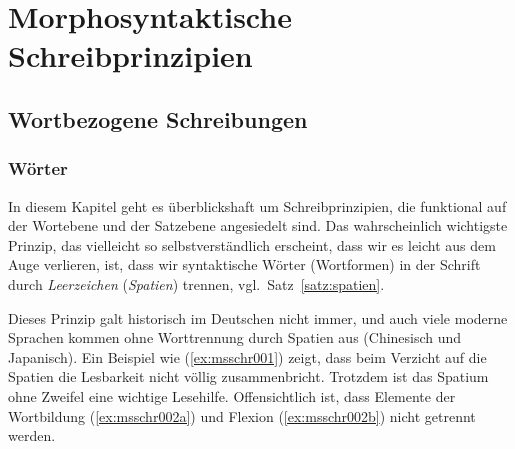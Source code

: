 \chapter{Morphosyntaktische Schreibprinzipien}

\label{sec:andereschrift}

\section{Wortbezogene Schreibungen}

\subsection{Wörter}

\label{sec:spatien}

In diesem Kapitel geht es überblickshaft um Schreibprinzipien, die funktional auf der Wortebene und der Satzebene angesiedelt sind.
Das wahrscheinlich wichtigste Prinzip, das vielleicht so selbstverständlich erscheint, dass wir es leicht aus dem Auge verlieren, ist, dass wir syntaktische Wörter (Wortformen) in der Schrift durch \textit{Leerzeichen} (\textit{Spatien}) trennen, vgl.\ Satz~\ref{satz:spatien}.


Dieses Prinzip galt historisch im Deutschen nicht immer, und auch viele moderne Sprachen kommen ohne Worttrennung durch Spatien aus (\zB Chinesisch und Japanisch).
Ein Beispiel wie (\ref{ex:msschr001}) zeigt, dass beim Verzicht auf die Spatien die Lesbarkeit nicht völlig zusammenbricht.
Trotzdem ist das Spatium ohne Zweifel eine wichtige Lesehilfe.
Offensichtlich ist, dass Elemente der Wortbildung (\ref{ex:msschr002a}) und Flexion (\ref{ex:msschr002b}) nicht getrennt werden.

\begin{exe}
  \ex\label{ex:msschr002} 
  \begin{xlist}
  \end{xlist}
\end{exe}

